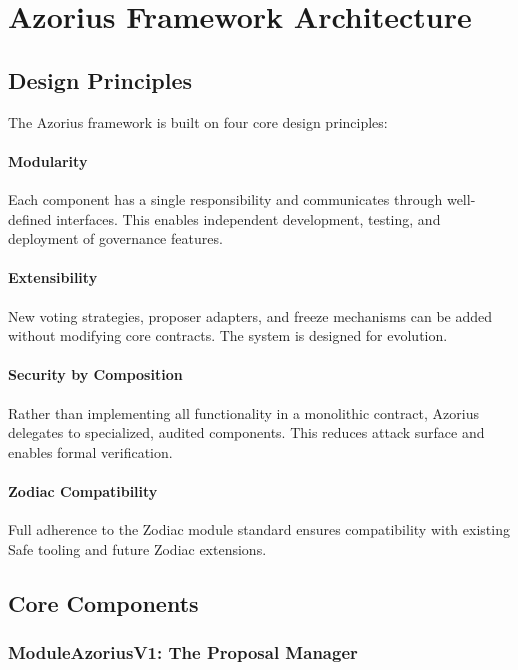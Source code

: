 \documentclass[11pt,a4paper]{article}
\begin{document}
\section{Azorius Framework Architecture}

\subsection{Design Principles}

The Azorius framework is built on four core design principles:

\paragraph{Modularity} Each component has a single responsibility and communicates through well-defined interfaces. This enables independent development, testing, and deployment of governance features.

\paragraph{Extensibility} New voting strategies, proposer adapters, and freeze mechanisms can be added without modifying core contracts. The system is designed for evolution.

\paragraph{Security by Composition} Rather than implementing all functionality in a monolithic contract, Azorius delegates to specialized, audited components. This reduces attack surface and enables formal verification.

\paragraph{Zodiac Compatibility} Full adherence to the Zodiac module standard ensures compatibility with existing Safe tooling and future Zodiac extensions.

\subsection{Core Components}

\subsubsection{ModuleAzoriusV1: The Proposal Manager}
\end{document}
